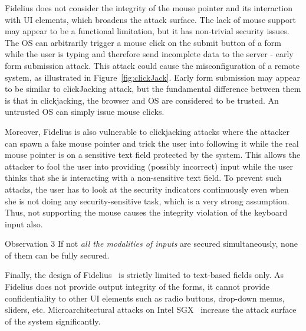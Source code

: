 

Fidelius does not consider the integrity of the mouse pointer and its interaction with UI elements, which broadens the attack surface. The lack of mouse support may appear to be a functional limitation, but it has non-trivial security issues.
The OS can arbitrarily trigger a mouse click on the submit button of a form while the user is typing and therefore send incomplete data to the server - early form submission attack.
This attack could cause the misconfiguration of a remote system, as illustrated in Figure~\ref{fig:clickJack}. Early form submission may appear to be similar to clickJacking attack, but the fundamental difference between them is that in clickjacking, the browser and OS are considered to be trusted. An untrusted OS can simply issue mouse clicks.

Moreover, Fidelius is also vulnerable to clickjacking attacks where the attacker can spawn a fake mouse pointer and trick the user into following it while the real mouse pointer is on a sensitive text field protected by the system. This allows the attacker to fool the user into providing (possibly incorrect) input while the user thinks that she is interacting with a non-sensitive text field. To prevent such attacks, the user has to look at the security indicators continuously even when she is not doing any security-sensitive task, which is a very strong assumption. 
Thus, not supporting the mouse causes the integrity violation of the keyboard input also.


\begin{mybox}[colback=white]{Observation 3}
If not \emph{all the modalities of inputs} are secured simultaneously, none of them can be fully secured.
\end{mybox}



Finally, the design of Fidelius~\cite{Fidelius} is strictly limited to text-based fields only. As Fidelius does not provide output integrity of the forms, it cannot provide confidentiality to other UI elements such as radio buttons, drop-down menus, sliders, etc.
Microarchitectural attacks on Intel SGX~\cite{van2018foreshadow} increase the attack surface of the system significantly.


